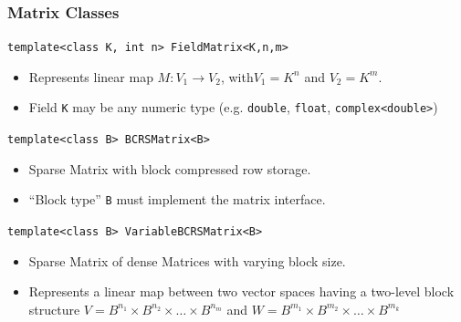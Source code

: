 \begin{frame} \frametitle{Matrix Classes}
  \begin{block}{\lstinline!template<class K, int n> FieldMatrix<K,n,m>!}
    \begin{itemize}
    \item Represents linear map $M: V_1 \to V_2$, with$V_1=K^n$ and
      $V_2=K^m$.
      \item Field \lstinline!K! may be any numeric type (e.g.
        \lstinline!double!, \lstinline!float!,
        \lstinline!complex<double>!)
    \end{itemize}
  \end{block}
  \begin{block}{ \lstinline!template<class B> BCRSMatrix<B>!}
    \begin{itemize}
    \item Sparse Matrix with block compressed row storage.
    \item ``Block type'' \lstinline!B! must implement the matrix interface.
    \end{itemize}
  \end{block}
  \begin{block}{\lstinline!template<class B> VariableBCRSMatrix<B>!}
    \begin{itemize}
    \item Sparse Matrix of dense Matrices with varying block size.
    \item Represents a linear map between two vector spaces having a two-level
block structure $V=B^{n_1}\times B^{n_2}\times\ldots \times B^{n_m}$
and $W=B^{m_1}\times B^{m_2}\times\ldots \times B^{m_k}$
    \end{itemize}
  \end{block}
\end{frame}

